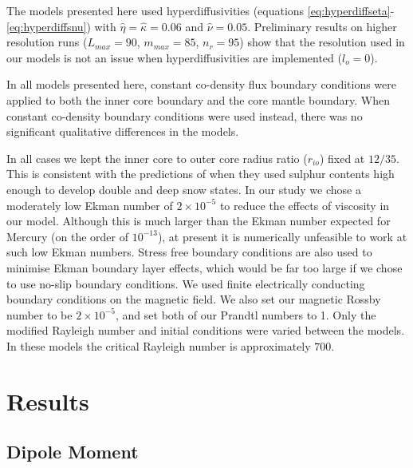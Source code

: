 The models presented here used hyperdiffusivities (equations \ref{eq:hyperdiffseta}-\ref{eq:hyperdiffsnu}) with $\hat{\eta}=\hat{\kappa}=0.06$ and $\hat{\nu}=0.05$. Preliminary results on higher resolution runs ($L_{max}=90$, $m_{max}=85$, $n_{r}=95$) show that the resolution used in our models is not an issue when hyperdiffusivities are implemented ($l_{o}=0$).

In all models presented here, constant co-density flux boundary conditions were applied to both the inner core boundary and the core mantle boundary. When constant co-density boundary conditions were used instead, there was no significant qualitative differences in the models. 

In all cases we kept the inner core to outer core radius ratio ($r_{io}$) fixed at $12/35$. This is consistent with the predictions of \citet{hauck04} when they used sulphur contents high enough to develop double and deep snow states. In our study we chose a moderately low Ekman number of $2\times10^{-5}$ to reduce the effects of viscosity in our model. Although this is much larger than the Ekman number expected for Mercury (on the order of $10^{-13}$), at present it is numerically unfeasible to work at such low Ekman numbers. Stress free boundary conditions are also used to minimise Ekman boundary layer effects, which would be far too large if we chose to use no-slip boundary conditions. We used finite electrically conducting boundary conditions on the magnetic field. We also set our magnetic Rossby number to be $2\times10^{-5}$, and set both of our Prandtl numbers to 1. Only the modified Rayleigh number  and initial conditions were varied between the models. In these models the critical Rayleigh number is approximately $700$.

\section{Results}
\subsection{Dipole Moment}

